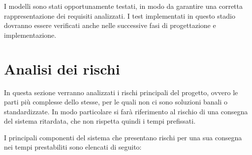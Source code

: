 \documentclass[a4paper,12pt]{report}
\begin{document}
I modelli sono stati opportunamente testati, in modo da garantire una corretta rappresentazione dei requisiti analizzati. I test implementati in questo stadio dovranno essere verificati anche nelle successive fasi di progettazione e implementazione.

\section{Analisi dei rischi}
In questa sezione verranno analizzati i rischi principali del progetto, ovvero le parti più complesse dello stesse, per le quali non ci sono soluzioni banali o standardizzate. In modo particolare si farà riferimento al rischio di una consegna del sistema ritardata, che non rispetta quindi i tempi prefissati. 

I principali componenti del sistema che presentano rischi per una sua consegna nei tempi prestabiliti sono elencati di seguito: 
\end{document}
